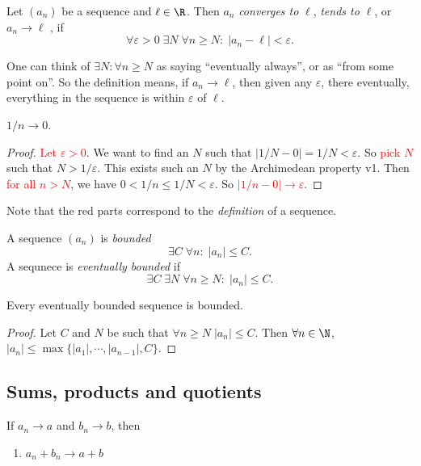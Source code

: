 \documentclass[a4paper]{article}
\begin{document}
\begin{defi}
  Let $(a_n)$ be a sequence and $\ell\in \R$. Then $a_n$ \emph{converges to} $\ell$, \emph{tends to} $\ell$, or $a_n \to \ell$ , if
  \[
    \forall \varepsilon > 0\;\exists N\; \forall n\geq N:\;|a_n - \ell| < \varepsilon.
  \]
\end{defi}
One can think of $\exists N : \forall n\geq N$ as saying ``eventually always'', or as ``from some point on''. So the definition means, if $a_n\to \ell$, then given any $\varepsilon$, there eventually, everything in the sequence is within $\varepsilon$ of $\ell$.

\begin{lemma}
  $1/n \to 0$.
\end{lemma}

\begin{proof}
  \textcolor{red}{Let $\varepsilon > 0$}. We want to find an $N$ such that $|1/N - 0| = 1/N < \varepsilon$. So \textcolor{red}{pick $N$} such that $N > 1/\varepsilon$. This exists such an $N$ by the Archimedean property v1. Then \textcolor{red}{for all $n > N$}, we have $0 < 1/n \leq 1/N < \varepsilon$. So \textcolor{red}{$|1/n - 0|\to \varepsilon$}.
\end{proof}
Note that the red parts correspond to the \emph{definition} of a sequence.

\begin{defi}
  A sequence $(a_n)$ is \emph{bounded}
  \[
    \exists C\;\forall n:\;|a_n| \leq C.
  \]
  A sequnece is \emph{eventually bounded} if
  \[
    \exists C\; \exists N\; \forall n\geq N:\; |a_n| \leq C.
  \]
\end{defi}
\begin{lemma}
  Every eventually bounded sequence is bounded.
\end{lemma}

\begin{proof}
  Let $C$ and $N$ be such that $\forall n\geq N\; |a_n| \leq C$. Then $\forall n \in \N$, $|a_n| \leq \max\{|a_1|, \cdots, |a_{n - 1}|, C\}$.
\end{proof}
\subsection{Sums, products and quotients}

\begin{lemma}
  If $a_n \to a$ and $b_n \to b$, then
  \begin{enumerate}
    \item $a_n + b_n \to a + b$
  \end{enumerate}
\end{lemma}
\end{document}
